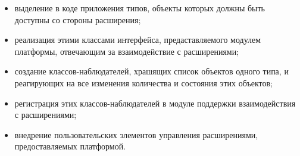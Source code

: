 \begin{itemize}
  \item выделение в коде приложения типов, объекты которых должны быть доступны со стороны расширения;
  \item реализация этими классами интерфейса, предаставляемого модулем платформы, отвечающим за взаимодействие с расширениями;
  \item создание классов-наблюдателей, храшящих список объектов одного типа, и реагирующих на все изменения количества и состояния этих объектов;
  \item регистрация этих классов-наблюдателей в модуле поддержки взаимодействия с расширениями;
  \item внедрение пользовательских элементов управления расширениями, предоставляемых платформой.
\end{itemize}

\pagebreak
